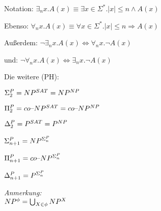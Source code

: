 




\begin{definition}
    


    Notation: $\exists_n x . A(x) \equiv \exists x \in \Sigma^\ast . |x| \leq n \land A(x)$

    Ebenso: $\forall_n x . A(x) \equiv \forall x \in \Sigma^\ast . |x| \leq n \Rightarrow A(x)$

    Außerdem: $\neg \exists_n x . A(x) \Leftrightarrow \forall_n x . \neg A(x)$

    und: $\neg \forall_n x . A(x) \Leftrightarrow \exists_n x . \neg A(x)$

\end{definition}




\begin{definition}
    
    Die weitere  (PH):

    $\Sigma_2^{P} = NP^{SAT} = NP^{NP}$

    $\Pi_2^{P} = co\text{--}NP^{SAT} = co\text{--}NP^{NP}$

    $\Delta_2^{P} = P^{SAT} = P^{NP}$

    $\Sigma_{n+1}^{P} = NP^{\Sigma_n^{P}}$

    $\Pi_{n+1}^{P} = co\text{--}NP^{\Sigma_n^{P}}$

    $\Delta_{n+1}^{P} = P^{\Sigma_n^{P}}$

    \textit{Anmerkung:}\\
    $NP^\phi = \bigcup_{X \in \phi} NP^X$


\end{definition}





